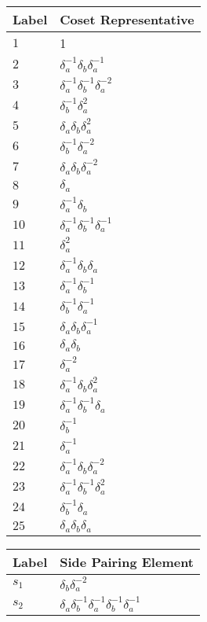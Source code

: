 \documentclass{article}
\begin{document}

\begin{center}
\begin{tabular}{ll}
\toprule
Label & Coset Representative\\
\midrule
$1$ & 1 \\
$2$ & $\delta_a^{-1}\delta_b^{}\delta_a^{-1}$ \\
$3$ & $\delta_a^{-1}\delta_b^{-1}\delta_a^{-2}$ \\
$4$ & $\delta_b^{-1}\delta_a^{2}$ \\
$5$ & $\delta_a^{}\delta_b^{}\delta_a^{2}$ \\
$6$ & $\delta_b^{-1}\delta_a^{-2}$ \\
$7$ & $\delta_a^{}\delta_b^{}\delta_a^{-2}$ \\
$8$ & $\delta_a^{}$ \\
$9$ & $\delta_a^{-1}\delta_b^{}$ \\
$10$ & $\delta_a^{-1}\delta_b^{-1}\delta_a^{-1}$ \\
$11$ & $\delta_a^{2}$ \\
$12$ & $\delta_a^{-1}\delta_b^{}\delta_a^{}$ \\
$13$ & $\delta_a^{-1}\delta_b^{-1}$ \\
$14$ & $\delta_b^{-1}\delta_a^{-1}$ \\
$15$ & $\delta_a^{}\delta_b^{}\delta_a^{-1}$ \\
$16$ & $\delta_a^{}\delta_b^{}$ \\
$17$ & $\delta_a^{-2}$ \\
$18$ & $\delta_a^{-1}\delta_b^{}\delta_a^{2}$ \\
$19$ & $\delta_a^{-1}\delta_b^{-1}\delta_a^{}$ \\
$20$ & $\delta_b^{-1}$ \\
$21$ & $\delta_a^{-1}$ \\
$22$ & $\delta_a^{-1}\delta_b^{}\delta_a^{-2}$ \\
$23$ & $\delta_a^{-1}\delta_b^{-1}\delta_a^{2}$ \\
$24$ & $\delta_b^{-1}\delta_a^{}$ \\
$25$ & $\delta_a^{}\delta_b^{}\delta_a^{}$ \\
\bottomrule
\end{tabular}
\hfill
\begin{tabular}{ll}
\toprule
Label & Side Pairing Element\\
\midrule
$s_{1}$ & $\delta_b^{}\delta_a^{-2}$ \\
$s_{2}$ & $\delta_a^{}\delta_b^{-1}\delta_a^{-1}\delta_b^{-1}\delta_a^{-1}$ \\

\end{tabular}
\end{center}
\end{document}
